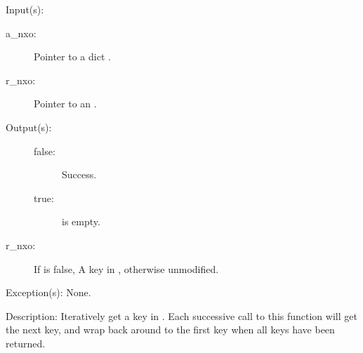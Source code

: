 \begin{capi}
	\begin{capilist}
	\item[Input(s): ]
		\begin{description}\item[]
		\item[a\_nxo: ]
			Pointer to a dict .
		\item[r\_nxo: ]
			Pointer to an .
		\end{description}
	\item[Output(s): ]
		\begin{description}\item[]
			\begin{description}\item[]
			\item[false: ]
				Success.
			\item[true: ]
				 is empty.
			\end{description}
		\item[r\_nxo: ]
			If  is false, A key in ,
			otherwise unmodified.
		\end{description}
	\item[Exception(s): ] None.
	\item[Description: ]
		Iteratively get a key in .  Each successive call to
		this function will get the next key, and wrap back around to the
		first key when all keys have been returned.
	\end{capilist}
\end{capi}
